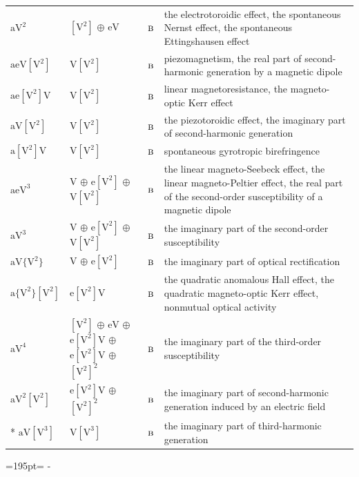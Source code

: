 \documentclass[10pt,a4paper]{article}
\newcommand{\needspace}[1]{\par\penalty-100\begingroup\dimen0=#1\relax\dimen2=\pagegoal
  \advance\dimen2-\pagetotal\ifdim\dimen0>\dimen2\relax\ifdim\dimen2>0pt\vfil\break\fi\fi
  \endgroup}
\numberwithin{equation}{section}
\newcommand{\irr}[1]{\text{\normalfont\scshape #1}}
\newcommand{\jahn}[1]{\mathrm{#1}}
\newlength{\fillwidth}\newlength{\cellwidth}\newlength{\colwidth}
\begin{document}
{\begin{longtable}{@{}lll>{\RaggedRight\arraybackslash}p{\fillwidth}@{}}
$\jahn{aV^{2}}$ & $\jahn{[V^{2}]}$ $\oplus$ $\jahn{eV}$ & $\irr{b}$ & the electrotoroidic effect, the spontaneous Nernst effect, the spontaneous Ettingshausen effect\\
$\jahn{aeV[V^{2}]}$ & $\jahn{V[V^{2}]}$ & $\irr{b}$ & piezomagnetism, the real part of second-harmonic generation by a magnetic dipole\\
$\jahn{ae[V^{2}]V}$ & $\jahn{V[V^{2}]}$ & $\irr{b}$ & linear magnetoresistance, the magneto-optic Kerr effect\\
$\jahn{aV[V^{2}]}$ & $\jahn{V[V^{2}]}$ & $\irr{b}$ & the piezotoroidic effect, the imaginary part of second-harmonic generation\\
$\jahn{a[V^{2}]V}$ & $\jahn{V[V^{2}]}$ & $\irr{b}$ & spontaneous gyrotropic birefringence\\
$\jahn{aeV^{3}}$ & $\jahn{V}$ $\oplus$ $\jahn{e[V^{2}]}$ $\oplus$ $\jahn{V[V^{2}]}$ & $\irr{b}$ & the linear magneto-Seebeck effect, the linear magneto-Peltier effect, the real part of the second-order susceptibility of a magnetic dipole\\
$\jahn{aV^{3}}$ & $\jahn{V}$ $\oplus$ $\jahn{e[V^{2}]}$ $\oplus$ $\jahn{V[V^{2}]}$ & $\irr{b}$ & the imaginary part of the second-order susceptibility\\
$\jahn{aV\{V^{2}\}}$ & $\jahn{V}$ $\oplus$ $\jahn{e[V^{2}]}$ & $\irr{b}$ & the imaginary part of optical rectification\\
$\jahn{a\{V^{2}\}[V^{2}]}$ & $\jahn{e[V^{2}]V}$ & $\irr{b}$ & the quadratic anomalous Hall effect, the quadratic magneto-optic Kerr effect, nonmutual optical activity\\
$\jahn{aV^{4}}$ & $\jahn{[V^{2}]}$ $\oplus$ $\jahn{eV}$ $\oplus$ $\jahn{e[V^{2}]V}$ $\oplus$ $\jahn{e[V^{2}]V}$ $\oplus$ $\jahn{[V^{2}]^{2}}$ & $\irr{b}$ & the imaginary part of the third-order susceptibility\\
$\jahn{aV^{2}[V^{2}]}$ & $\jahn{e[V^{2}]V}$ $\oplus$ $\jahn{[V^{2}]^{2}}$ & $\irr{b}$ & the imaginary part of second-harmonic generation induced by an electric field\\*
$\jahn{aV[V^{3}]}$ & $\jahn{V[V^{3}]}$ & $\irr{b}$ & the imaginary part of third-harmonic generation\\
\bottomrule\end{longtable}}
\needspace{195pt}
\end{document}
